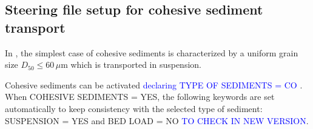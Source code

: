 \subsection{Steering file setup for cohesive sediment transport}
In \gaia{}, the simplest case of cohesive sediments
is characterized by a uniform grain size $D_{50}\leq 60\,\mu$m which is
transported in suspension.

Cohesive sediments can be activated \textcolor{blue}{declaring {\ttfamily TYPE OF SEDIMENTS = CO}} . When {\ttfamily COHESIVE SEDIMENTS = YES}, the following keywords are set automatically to keep consistency with the selected type of sediment: {\ttfamily SUSPENSION = YES} and {\ttfamily BED LOAD = NO} \textcolor{blue}{TO CHECK IN NEW VERSION}.
